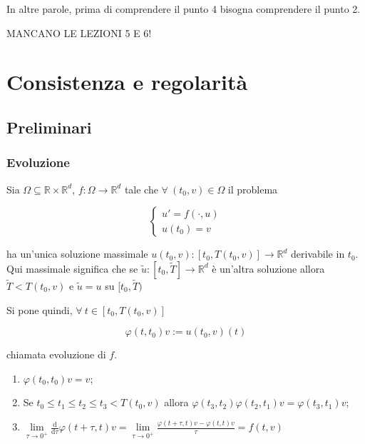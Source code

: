 \documentclass[hidelinks, 10pt]{report}
\begin{document}
In altre parole, prima di comprendere il punto 4 bisogna comprendere il punto 2.


										MANCANO LE LEZIONI 5 E 6!


\chapter{Consistenza e regolarit\`a}
\section{Preliminari}
\subsection{Evoluzione}
Sia $ \Omega \subseteq \mathbb{R} \times \mathbb{R}^{d} $, $ f: \Omega \to \mathbb{R}^{d} $ tale che $ \forall\ (t_{0}, v) \in \Omega $ il problema

\begin{equation}	\label{eq:probevol}
\begin{cases}
u' = f(\cdot, u) \\
u(t_{0}) = v
\end{cases}
\end{equation}

ha un'unica soluzione massimale $ u(t_{0}, v) : [t_{0}, T(t_{0}, v)] \to \mathbb{R}^{d} $ derivabile in $ t_{0} $. Qui massimale significa che se $ \tilde{u} : [t_{0}, \tilde{T}] \to \mathbb{R}^{d} $ \`e un'altra soluzione allora $ \tilde{T} < T(t_{0}, v) $ e $ \tilde{u} = u $ su $ [t_{0}, \tilde{T}) $

Si pone quindi, $ \forall\ t \in [t_{0}, T(t_{0}, v)] $

\[ \varphi(t, t_{0}) v := u{(t_{0}, v)} (t) \]

chiamata evoluzione di $ f $.

\begin{oss}
\noindent
\begin{enumerate}
\item $ \varphi(t_{0}, t_{0}) v = v $;
\item Se $ t_{0} \le t_{1} \le t_{2} \le t_{3} < T(t_{0}, v) $ allora $ \varphi(t_{3}, t_{2}) \varphi(t_{2}, t_{1}) v = \varphi(t_{3}, t_{1}) v $;
\item $ \lim\limits_{\tau \to 0^{+}} \frac{\mathrm{d}}{\mathrm{d} \tau} \varphi (t + \tau, t)v = \lim\limits_{\tau \to 0^{+}} \frac{\varphi(t + \tau, t)v - \varphi(t, t)v}{\tau} = f(t, v) $
\end{enumerate}
\end{oss}
\end{document}
